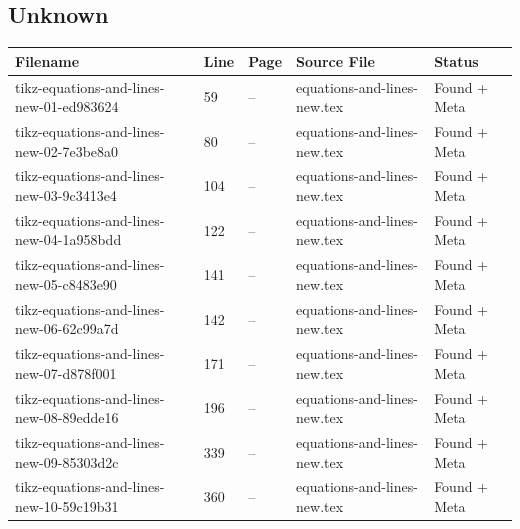 \documentclass[11pt]{article}
\begin{document}
\subsection{Unknown}



\begin{longtable}{|p{3.5cm}|p{1.5cm}|p{1cm}|p{4cm}|p{2cm}|}
\hline
\textbf{Filename} & \textbf{Line} & \textbf{Page} & \textbf{Source File} & \textbf{Status} \\
\hline
\endhead

tikz-equations-and-lines-new-01-ed983624 & 59 & -- & equations-and-lines-new.tex & \textcolor{found}{Found + Meta} \\
\hline

tikz-equations-and-lines-new-02-7e3be8a0 & 80 & -- & equations-and-lines-new.tex & \textcolor{found}{Found + Meta} \\
\hline

tikz-equations-and-lines-new-03-9c3413e4 & 104 & -- & equations-and-lines-new.tex & \textcolor{found}{Found + Meta} \\
\hline

tikz-equations-and-lines-new-04-1a958bdd & 122 & -- & equations-and-lines-new.tex & \textcolor{found}{Found + Meta} \\
\hline

tikz-equations-and-lines-new-05-c8483e90 & 141 & -- & equations-and-lines-new.tex & \textcolor{found}{Found + Meta} \\
\hline

tikz-equations-and-lines-new-06-62c99a7d & 142 & -- & equations-and-lines-new.tex & \textcolor{found}{Found + Meta} \\
\hline

tikz-equations-and-lines-new-07-d878f001 & 171 & -- & equations-and-lines-new.tex & \textcolor{found}{Found + Meta} \\
\hline

tikz-equations-and-lines-new-08-89edde16 & 196 & -- & equations-and-lines-new.tex & \textcolor{found}{Found + Meta} \\
\hline

tikz-equations-and-lines-new-09-85303d2c & 339 & -- & equations-and-lines-new.tex & \textcolor{found}{Found + Meta} \\
\hline

tikz-equations-and-lines-new-10-59c19b31 & 360 & -- & equations-and-lines-new.tex & \textcolor{found}{Found + Meta} \\
\hline

\end{longtable}
\end{document}
